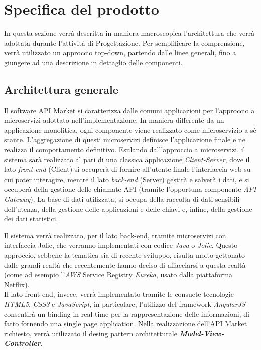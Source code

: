 \newpage
\section{Specifica del prodotto}
In questa sezione verrà descritta in maniera macroscopica l'architettura che verrà adottata durante l'attività di Progettazione. Per semplificare la comprensione, verrà utilizzato un approccio top-down, partendo dalle linee generali, fino a giungere ad una descrizione in dettaglio delle componenti.

\subsection{Architettura generale}
Il software API Market si caratterizza dalle comuni applicazioni per l'approccio a microservizi adottato nell'implementazione. In maniera differente da un applicazione monolitica, ogni componente viene realizzato come microservizio a sè stante. L'aggregazione di questi microservizi definisce l'applicazione finale e ne realizza il comportamento definitivo. Esulando dall'approccio a microservizi, il sistema sarà realizzato al pari di una classica applicazione \textit{Client-Server}, dove il lato \textit{front-end} (Client) si occuperà di fornire all'utente finale l'interfaccia web su cui poter interagire, mentre il lato \textit{back-end} (Server) gestirà e salverà i dati, e si occuperà della gestione delle chiamate API (tramite l'opportuna componente \textit{API Gateway}). La base di dati utilizzata, si occupa della raccolta di dati sensibili dell'utenza, della gestione delle applicazioni e delle chiavi e, infine, della gestione dei dati statistici.

Il sistema verrà realizzato, per il lato back-end, tramite microservizi con interfaccia Jolie, che verranno implementati con codice \textit{Java} o \textit{Jolie}. Questo approccio, sebbene la tematica sia di recente sviluppo, risulta molto gettonato dalle grandi realtà che recentemente hanno deciso di affacciarsi a questa realtà (come ad esempio l'\textit{AWS} Service Registry \textit{Eureka}, usato dalla piattaforma Netflix).\\
Il lato front-end, invece, verrà implementato tramite le consuete tecnologie \textit{HTML5}, \textit{CSS3} e \textit{JavaScript}, in particolare, l'utilizzo del framework \textit{AngularJS} consentirà un binding in real-time per la rappresentazione delle informazioni, di fatto fornendo una single page application.
Nella realizzazione dell'API Market richiesto, verrà utilizzato il desing pattern architetturale \textbf{\textit{Model-View-Controller}}.

